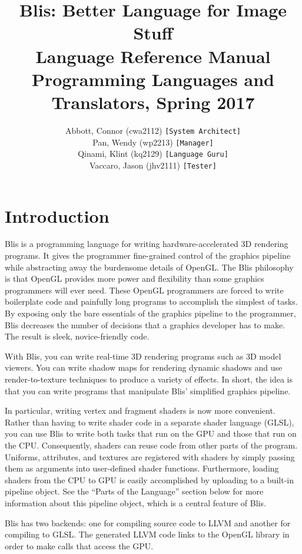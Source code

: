 \documentclass[11pt]{article}
\title{Blis: Better Language for Image Stuff \\
  \Large Language Reference Manual \\
\Large Programming Languages and Translators, Spring 2017 }
\author{
  Abbott, Connor (cwa2112) \hspace{5mm} \hfill \texttt{[System Architect]} \\
  Pan, Wendy (wp2213)                   \hfill \texttt{[Manager]}          \\
  Qinami, Klint (kq2129)                \hfill \texttt{[Language Guru]}    \\
  Vaccaro, Jason (jhv2111)               \hfill \texttt{[Tester]}       
}
\begin{document}
\maketitle

\section{Introduction}

    Blis is a programming language for writing
    hardware-accelerated 3D rendering programs. 
    It gives the programmer fine-grained control of the 
    graphics pipeline while abstracting away the burdensome 
    details of OpenGL. The Blis philosophy is that OpenGL 
    provides more power and flexibility than some graphics 
    programmers will ever need. These OpenGL programmers are 
    forced to write boilerplate code and painfully long 
    programs to accomplish the simplest of tasks. By exposing %
    only the bare essentials of the graphics pipeline to the 
    programmer,  Blis decreases the number of decisions that 
    a graphics developer has to make. The result is sleek, 
    novice-friendly code.
    
    
    With Blis, you can write real-time 3D rendering programs 
    such as 3D model viewers. You can write shadow maps for 
    rendering dynamic shadows and use render-to-texture 
    techniques to produce a variety of effects. In short, the 
    idea is that you can write programs that manipulate Blis’
    simplified graphics pipeline.
    
    
    In particular, writing vertex and fragment shaders is now more convenient. 
    Rather than having to write shader code in a separate shader language 
    (GLSL), you can use Blis to write both tasks that run on the GPU and those 
    that run on the CPU. Consequently, shaders can reuse code from other parts 
    of the program. Uniforms, attributes, and textures are registered with 
    shaders by simply passing them as arguments into user-defined shader 
    functions. Furthermore, loading shaders from the CPU to GPU is easily 
    accomplished by uploading to a built-in pipeline object. See the “Parts of 
    the Language” section below for more information about this pipeline object, %
    which is a central feature of Blis. 
    
    Blis has two backends: one for compiling source code to LLVM and another for %
    compiling to GLSL. The generated LLVM code links to the OpenGL library in 
    order to make calls that access the GPU. 
\end{document}
